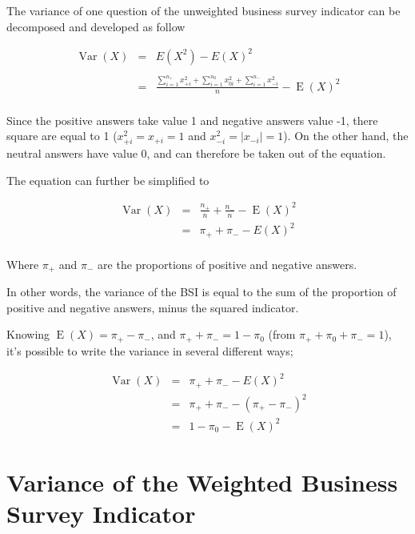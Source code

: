 \documentclass[12pt,a4paper,oneside]{book}
\DeclareMathOperator{\Var}{Var}
\DeclareMathOperator{\E}{E}
\begin{document}
The variance of one question of the unweighted business survey indicator can be decomposed and developed as follow

\begin{eqnarray}
\Var(X) &=&  E\left( X^2\right) - E\left( X\right)^2 \nonumber \\ \nonumber \\
    &=&  \frac{\sum_{i=1}^{n_+} x_{+i}^2  +  \sum_{i=1}^{n_0} x_{0i}^2 + \sum_{i=1}^{n_-} x_{-i}^2}{n}  - \E(X)^2 \\ \nonumber
\end{eqnarray}


Since the positive answers take value 1 and negative answers value -1, there square are equal to 1 ($x_{+i}^2 = x_{+i} = 1$ and $x_{-i}^2 = |x_{-i}| = 1$). 
On the other hand, the neutral answers have value 0, and can therefore be taken out of the equation.

The equation can further be simplified to

\begin{eqnarray}
    \Var(X) &=&  \frac{n_+}{n}  +  \frac{n_-}{n}  - \E(X)^2 \\
    &=& \pi_+ + \pi_- - E ( X )^2 \label{var1} \\ \nonumber
\end{eqnarray}

Where $\pi_+$ and $\pi_-$ are the proportions of positive and negative answers.

In other words, the variance of the BSI is equal to the sum of the proportion of positive and negative answers, minus the squared indicator.

Knowing $\E(X)=\pi_+ - \pi_-$, and $\pi_+ + \pi_- = 1 - \pi_0$ (from $\pi_+ + \pi_0 + \pi_- = 1$),
it's possible to write the variance in several different ways;


\begin{eqnarray}
\Var(X) &=& \pi_+ + \pi_- - E ( X )^2  \nonumber \\
        &=& \pi_+ + \pi_- - ( \pi_+ - \pi_- )^2 \label{eq:var2} \\
        &=& 1 - \pi_0 - \E(X)^2 \label{eq:var3}
\end{eqnarray}




\section{Variance of the Weighted Business Survey Indicator}
\end{document}
